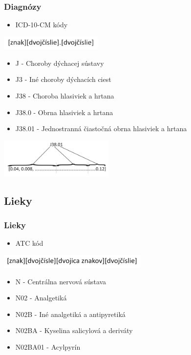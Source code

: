 \documentclass[slovak]{beamer}
\begin{document}
\begin{frame}
	\frametitle{Diagnózy}
	\begin{itemize}
		\item<1> ICD-10-CM kódy
	\end{itemize}

	\begin{center}
		\includegraphics[height=0.7cm]{images/ICD_code.png}
	\end{center}
	\begin{itemize}
		\item<1> J - Choroby dýchacej sústavy
		\item<1> J3 - Iné choroby dýchacích ciest 
		\item<1> J38 - Choroba hlasiviek a hrtana
		\item<1> J38.0 - Obrna hlasiviek a hrtana
		\item<1> J38.01 - Jednostranná čiastočná obrna hlasiviek a hrtana
	\end{itemize}

	\begin{center}
		\includegraphics[height=2cm]{images/ICD_code_emb.png}
	\end{center}
\end{frame}

\subsection{Lieky}

\begin{frame}
	\frametitle{Lieky}
	\begin{itemize}
		\item<1> ATC kód
	\end{itemize}
	\begin{center}
		\includegraphics[height=0.7cm]{images/ATC_code.png}
	\end{center}
	\begin{itemize}
		\item<1> N - Centrálna nervová sústava
		\item<1> N02 - Analgetiká
		\item<1> N02B - Iné analgetiká a antipyretiká
		\item<1> N02BA - Kyselina salicylová a deriváty
		\item<1> N02BA01 - Acylpyrín
	\end{itemize}
	
\end{frame}
\end{document}
